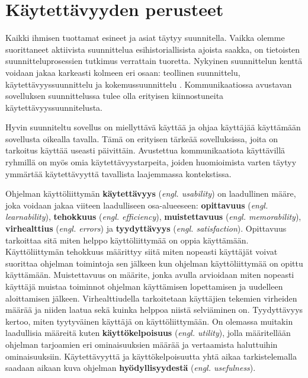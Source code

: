 \documentclass[utf8]{gradu3}
\begin{document}
\section{Käytettävyyden perusteet}

Kaikki ihmisen tuottamat esineet ja asiat täytyy suunnitella. Vaikka olemme suorittaneet aktiivista suunnittelua esihistoriallisista ajoista saakka, on tietoisten suunnitteluprosessien tutkimus verrattain tuoretta. Nykyinen suunnittelun kenttä voidaan jakaa karkeasti kolmeen eri osaan: teollinen suunnittelu, käytettävyyssuunnittelu ja kokemussuunnittelu \parencite[]{norman-doet}. Kommunikaatiossa avustavan sovelluksen suunnittelussa tulee olla erityisen kiinnostuneita käytettävyyssuunnitelusta.

Hyvin suunniteltu sovellus on miellyttävä käyttää ja ohjaa käyttäjää käyttämään sovellusta oikealla tavalla. Tämä on erityisen tärkeää sovelluksissa, joita on tarkoitus käyttää useasti päivittäin. Avustettua kommunikaatiota käyttävillä ryhmillä on myös omia käytettävyystarpeita, joiden huomioimista varten täytyy ymmärtää käytettävyyttä tavallista laajemmassa kontekstissa.

Ohjelman käyttöliittymän \textbf{käytettävyys} (\textit{engl. usability}) on laadullinen määre, joka voidaan jakaa viiteen laadulliseen osa-alueeseen: \textbf{opittavuus} (\textit{engl. learnability}), \textbf{tehokkuus} (\textit{engl. efficiency}), \textbf{muistettavuus} (\textit{engl. memorability}), \textbf{virhealttius} (\textit{engl. errors}) ja \textbf{tyydyttävyys} (\textit{engl. satisfaction}). Opittavuus tarkoittaa sitä miten helppo käyttöliittymää on oppia käyttämään. Käyttöliittymän tehokkuus määrittyy siitä miten nopeasti käyttäjät voivat suorittaa ohjelman toimintoja sen jälkeen kun ohjelman käyttöliittymää on opittu käyttämään. Muistettavuus on määrite, jonka avulla arvioidaan miten nopeasti käyttäjä muistaa toiminnot ohjelman käyttämisen lopettamisen ja uudelleen aloittamisen jälkeen. Virhealttiudella tarkoitetaan käyttäjien tekemien virheiden määrää ja niiden laatua sekä kuinka helppoa niistä selviäminen on. Tyydyttävyys kertoo,  miten tyytyväinen käyttäjä on käyttöliittymään. On olemassa muitakin laadullisia määreitä kuten \textbf{käyttökelpoisuus} (\textit{engl. utility}), jolla määritellään ohjelman tarjoamien eri ominaisuuksien määrää ja vertaamista haluttuihin ominaisuuksiin. Käytettävyyttä ja käyttökelpoisuutta yhtä aikaa tarkistelemalla saadaan aikaan kuva ohjelman \textbf{hyödyllisyydestä} (\textit{engl. usefulness}). \parencite[]{usability-101}
\end{document}
